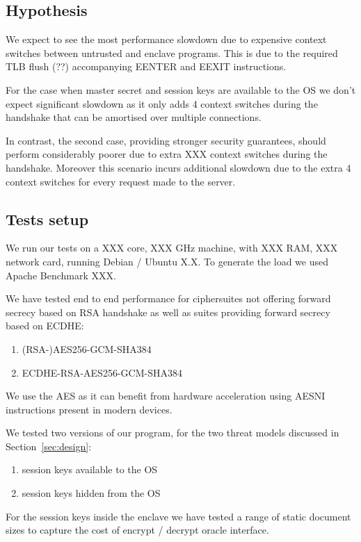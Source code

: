 \documentclass[../main.tex]{subfiles}
\begin{document}
\subsection{Hypothesis}
We expect to see the most performance slowdown due to expensive context
switches between untrusted and enclave programs. This is due to the required
TLB flush (??) accompanying EENTER and EEXIT instructions.

For the case when master secret and session keys are available to the OS we
don't expect significant slowdown as it only adds 4 context switches during
the handshake that can be amortised over multiple connections.

In contrast, the second case, providing stronger security guarantees, should
perform considerably poorer due to extra XXX context switches during the
handshake. Moreover this scenario incurs additional slowdown due to the extra
4 context switches for every request made to the server.

\subsection{Tests setup}
We run our tests on a XXX core, XXX GHz machine, with XXX RAM, XXX network
card, running Debian / Ubuntu X.X. To generate the load we used Apache
Benchmark XXX.

We have tested end to end performance for ciphersuites not offering forward
secrecy based on RSA handshake as well as suites providing forward secrecy
based on ECDHE:
\begin{enumerate}
  \item (RSA-)AES256-GCM-SHA384
  \item ECDHE-RSA-AES256-GCM-SHA384
\end{enumerate}

We use the AES as it can benefit from hardware acceleration using AESNI
instructions present in modern devices.

We tested two versions of our program, for the two threat models discussed in
Section~\ref{sec:design}:
\begin{enumerate}
  \item session keys available to the OS
  \item session keys hidden from the OS
\end{enumerate}

For the session keys inside the enclave we have tested a range of static
document sizes to capture the cost of encrypt / decrypt oracle interface.
\end{document}
